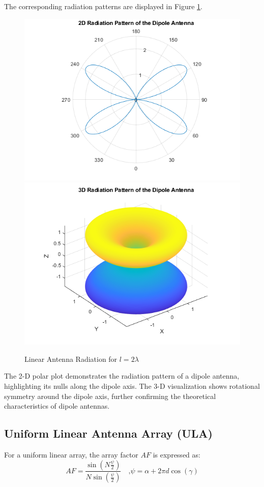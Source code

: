 \documentclass[a4paper, 12pt, english]{article}
\begin{document}
The corresponding radiation patterns are displayed in Figure \ref{fig:Linear Antenna Radiation 2}.
\begin{figure}[H]
    \centering
         \includegraphics[width=0.49\linewidth]{report/images/linear_antenna_2D_2.png}
         \hfill
         \includegraphics[width=0.49\linewidth]{report/images/linear_antenna_3D_2.png}
         \caption{Linear Antenna Radiation for $ {l} = {2}{\lambda} $}
         \label{fig:Linear Antenna Radiation 2}
\end{figure}

\noindent
The 2-D polar plot demonstrates the radiation pattern of a dipole antenna, highlighting its nulls along the dipole axis. The 3-D visualization shows rotational symmetry around the dipole axis, further confirming the theoretical characteristics of dipole antennas.

\subsection{Uniform Linear Antenna Array (ULA)} \label{sec:ula}


For a uniform linear array, the array factor $ {AF} $ is expressed as:
\[ {{AF} = {\frac{\sin{\left({{N}{\frac{\psi}{2}}}\right)}}{{N}{\sin{\left({\frac{\psi}{2}}\right)}}}}} \quad\mbox{,} {{\psi} = {{\alpha} + {2}{\pi}{d}{\cos{\left({\gamma}\right)}}}} \]
\end{document}
